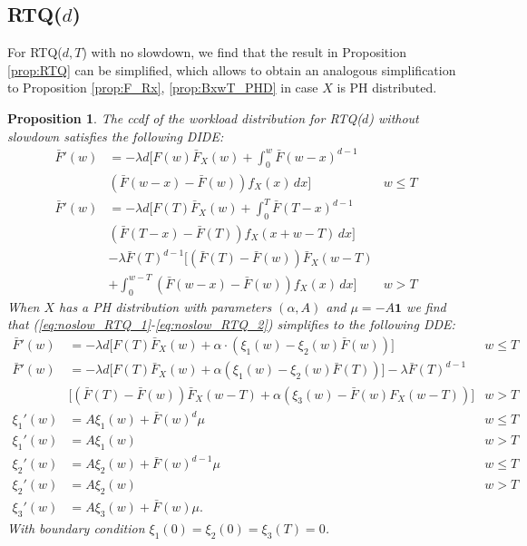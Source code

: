 \documentclass[12pt]{report}
\newtheorem{proposition}[theorem]{Proposition}
\begin{document}
\subsection{RTQ($d$)}\label{RTQ:identical}
For RTQ($d,T$) with no slowdown, we find that the result in Proposition \ref{prop:RTQ} can be simplified, which allows to obtain an analogous simplification to Proposition \ref{prop:F_Rx}, \ref{prop:BxwT_PHD} in case $X$ is PH distributed.
\begin{proposition}
	The ccdf of the workload distribution for RTQ($d$) without slowdown satisfies the following DIDE:
	\begin{align}
		\bar F'(w)
		&= - \lambda d \bigg[ F(w) \bar F_X(w) + \int_0^w \bar F(w-x)^{d-1}\nonumber\\
		& \left( \bar F(w-x) - \bar F(w) \right) f_X(x) \, dx \bigg] & w \leq T \label{eq:noslow_RTQ_1}\\
		\bar F'(w)
		&= - \lambda d \bigg[ F(T) \bar F_X(w) + \int_0^T \bar F(T-x)^{d-1} \nonumber\\
		& \left( \bar F(T-x) - \bar F(T) \right) f_X(x+w-T) \, dx \bigg] \nonumber\\
		&-\lambda \bar F(T)^{d-1} \bigg[ \left( \bar F(T) - \bar F(w) \right) \bar F_X(w-T) \nonumber\\
		& + \int_0^{w-T} \left(\bar F(w-x) - \bar F(w) \right) f_X(x) \, dx\bigg]  & w>T \label{eq:noslow_RTQ_2}
	\end{align}
	When $X$ has a PH distribution with parameters $(\alpha,A)$ and $\mu = -A \textbf{1}$ we find that (\ref{eq:noslow_RTQ_1}-\ref{eq:noslow_RTQ_2}) simplifies to the following DDE:
	\begin{align*}
		\bar F'(w)
		&= -\lambda d \bigg[ F(T) \bar F_X(w) + \alpha \cdot \left( \xi_1(w) - \xi_2(w) \bar F(w) \right) \bigg] & w \leq T\\
		\bar F'(w)
		&= - \lambda d \bigg[ F(T) \bar F_X(w) + \alpha \left( \xi_1(w) - \xi_2(w) \bar F(T) \right) \bigg] - \lambda \bar F(T)^{d-1} \\
		& \bigg[ (\bar F(T) - \bar F(w)) \bar F_X(w-T)  + \alpha \left( \xi_3(w) - \bar F(w) F_X(w-T) \right) \bigg] & w > T\\
		\xi_1'(w) & = A \xi_1(w) + \bar F(w)^d \mu & w\leq T\\
		\xi_1'(w) &= A \xi_1(w) & w > T\\
		\xi_2'(w) &= A \xi_2(w) + \bar F(w)^{d-1} \mu & w \leq T\\
		\xi_2'(w) &= A \xi_2(w) & w>T\\
		\xi_3'(w) &= A \xi_3(w) + \bar F(w) \mu.
	\end{align*}
	With boundary condition $\xi_1(0)=\xi_2(0)=\xi_3(T)=0$.
\end{proposition}
\end{document}
